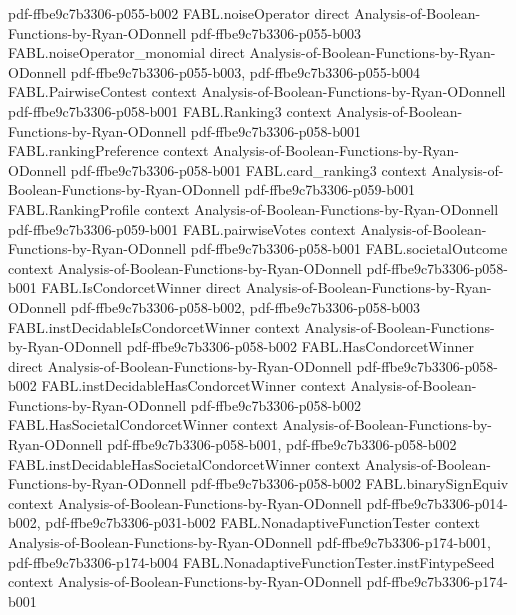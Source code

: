 \begin{theorem}
  {pdf-ffbe9c7b3306-p055-b002}
\proofstep
  {FABL.noiseOperator}
  {direct}
  {Analysis-of-Boolean-Functions-by-Ryan-ODonnell}
  {pdf-ffbe9c7b3306-p055-b003}
\proofstep
  {FABL.noiseOperator_monomial}
  {direct}
  {Analysis-of-Boolean-Functions-by-Ryan-ODonnell}
  {pdf-ffbe9c7b3306-p055-b003,
    pdf-ffbe9c7b3306-p055-b004}
\proofstep
  {FABL.PairwiseContest}
  {context}
  {Analysis-of-Boolean-Functions-by-Ryan-ODonnell}
  {pdf-ffbe9c7b3306-p058-b001}
\proofstep
  {FABL.Ranking3}
  {context}
  {Analysis-of-Boolean-Functions-by-Ryan-ODonnell}
  {pdf-ffbe9c7b3306-p058-b001}
\proofstep
  {FABL.rankingPreference}
  {context}
  {Analysis-of-Boolean-Functions-by-Ryan-ODonnell}
  {pdf-ffbe9c7b3306-p058-b001}
\proofstep
  {FABL.card_ranking3}
  {context}
  {Analysis-of-Boolean-Functions-by-Ryan-ODonnell}
  {pdf-ffbe9c7b3306-p059-b001}
\proofstep
  {FABL.RankingProfile}
  {context}
  {Analysis-of-Boolean-Functions-by-Ryan-ODonnell}
  {pdf-ffbe9c7b3306-p059-b001}
\proofstep
  {FABL.pairwiseVotes}
  {context}
  {Analysis-of-Boolean-Functions-by-Ryan-ODonnell}
  {pdf-ffbe9c7b3306-p058-b001}
\proofstep
  {FABL.societalOutcome}
  {context}
  {Analysis-of-Boolean-Functions-by-Ryan-ODonnell}
  {pdf-ffbe9c7b3306-p058-b001}
\proofstep
  {FABL.IsCondorcetWinner}
  {direct}
  {Analysis-of-Boolean-Functions-by-Ryan-ODonnell}
  {pdf-ffbe9c7b3306-p058-b002,
    pdf-ffbe9c7b3306-p058-b003}
\proofstep
  {FABL.instDecidableIsCondorcetWinner}
  {context}
  {Analysis-of-Boolean-Functions-by-Ryan-ODonnell}
  {pdf-ffbe9c7b3306-p058-b002}
\proofstep
  {FABL.HasCondorcetWinner}
  {direct}
  {Analysis-of-Boolean-Functions-by-Ryan-ODonnell}
  {pdf-ffbe9c7b3306-p058-b002}
\proofstep
  {FABL.instDecidableHasCondorcetWinner}
  {context}
  {Analysis-of-Boolean-Functions-by-Ryan-ODonnell}
  {pdf-ffbe9c7b3306-p058-b002}
\proofstep
  {FABL.HasSocietalCondorcetWinner}
  {context}
  {Analysis-of-Boolean-Functions-by-Ryan-ODonnell}
  {pdf-ffbe9c7b3306-p058-b001,
    pdf-ffbe9c7b3306-p058-b002}
\proofstep
  {FABL.instDecidableHasSocietalCondorcetWinner}
  {context}
  {Analysis-of-Boolean-Functions-by-Ryan-ODonnell}
  {pdf-ffbe9c7b3306-p058-b002}
\proofstep
  {FABL.binarySignEquiv}
  {context}
  {Analysis-of-Boolean-Functions-by-Ryan-ODonnell}
  {pdf-ffbe9c7b3306-p014-b002,
    pdf-ffbe9c7b3306-p031-b002}
\proofstep
  {FABL.NonadaptiveFunctionTester}
  {context}
  {Analysis-of-Boolean-Functions-by-Ryan-ODonnell}
  {pdf-ffbe9c7b3306-p174-b001,
    pdf-ffbe9c7b3306-p174-b004}
\proofstep
  {FABL.NonadaptiveFunctionTester.instFintypeSeed}
  {context}
  {Analysis-of-Boolean-Functions-by-Ryan-ODonnell}
  {pdf-ffbe9c7b3306-p174-b001}

\end{theorem}
